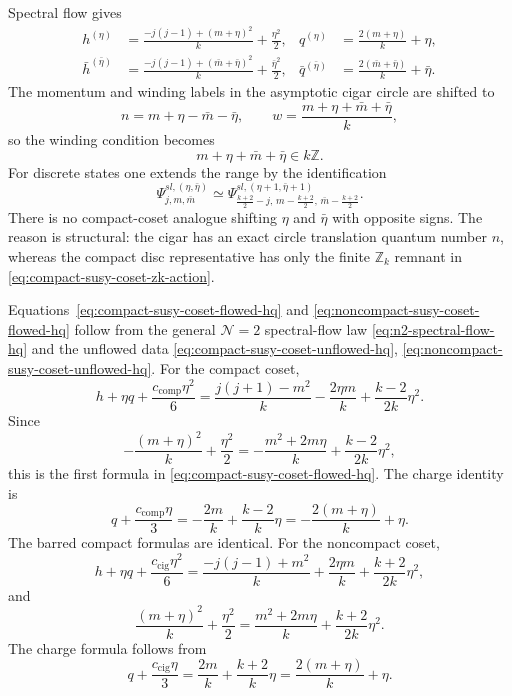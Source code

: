 Spectral flow gives
\begin{align}
  h^{(\eta)}
  &=
  \frac{-j(j-1)+(m+\eta)^2}{k}+\frac{\eta^2}{2},
  &
  q^{(\eta)}
  &=
  \frac{2(m+\eta)}{k}+\eta,
  \label{eq:noncompact-susy-coset-flowed-hq}\\
  \bar h^{(\bar\eta)}
  &=
  \frac{-j(j-1)+(\bar m+\bar\eta)^2}{k}
  +\frac{\bar\eta^2}{2},
  &
  \bar q^{(\bar\eta)}
  &=
  \frac{2(\bar m+\bar\eta)}{k}+\bar\eta .
  \nonumber
\end{align}
The momentum and winding labels in the asymptotic cigar circle are shifted
to
\begin{equation}
  n=m+\eta-\bar m-\bar\eta,
  \qquad
  w=\frac{m+\eta+\bar m+\bar\eta}{k},
  \label{eq:noncompact-susy-coset-momentum-winding}
\end{equation}
so the winding condition becomes
\begin{equation}
  m+\eta+\bar m+\bar\eta\in k\mathbb Z .
  \label{eq:noncompact-susy-coset-flowed-winding}
\end{equation}
For discrete states one extends the range by the identification
\begin{equation}
  \Psi^{sl,(\eta,\bar\eta)}_{j,m,\bar m}
  \simeq
  \Psi^{sl,(\eta+1,\bar\eta+1)}
       _{\frac{k+2}{2}-j,\,
         m-\frac{k+2}{2},\,\bar m-\frac{k+2}{2}} .
  \label{eq:noncompact-susy-coset-field-identification}
\end{equation}
There is no compact-coset analogue shifting \(\eta\) and \(\bar\eta\) with
opposite signs.  The reason is structural: the cigar has an exact circle
translation quantum number \(n\), whereas the compact disc representative has
only the finite \(\mathbb Z_k\) remnant in
\eqref{eq:compact-susy-coset-zk-action}.

\begin{remark}
\label{rem:supersymmetric-rank-one-spectral-flow-check}
Equations~\eqref{eq:compact-susy-coset-flowed-hq} and
\eqref{eq:noncompact-susy-coset-flowed-hq} follow from the general
\(\mathcal N=2\) spectral-flow law
\eqref{eq:n2-spectral-flow-hq} and the unflowed data
\eqref{eq:compact-susy-coset-unflowed-hq},
\eqref{eq:noncompact-susy-coset-unflowed-hq}.
For the compact coset,
\[
  h+\eta q+\frac{c_{\mathrm{comp}}\eta^2}{6}
  =
  \frac{j(j+1)-m^2}{k}
  -\frac{2\eta m}{k}
  +\frac{k-2}{2k}\eta^2 .
\]
Since
\[
  -\frac{(m+\eta)^2}{k}+\frac{\eta^2}{2}
  =
  -\frac{m^2+2m\eta}{k}
  +\frac{k-2}{2k}\eta^2,
\]
this is the first formula in
\eqref{eq:compact-susy-coset-flowed-hq}.  The charge identity is
\[
  q+\frac{c_{\mathrm{comp}}\eta}{3}
  =
  -\frac{2m}{k}+\frac{k-2}{k}\eta
  =
  -\frac{2(m+\eta)}{k}+\eta .
\]
The barred compact formulas are identical.  For the noncompact coset,
\[
  h+\eta q+\frac{c_{\mathrm{cig}}\eta^2}{6}
  =
  \frac{-j(j-1)+m^2}{k}
  +\frac{2\eta m}{k}
  +\frac{k+2}{2k}\eta^2 ,
\]
and
\[
  \frac{(m+\eta)^2}{k}+\frac{\eta^2}{2}
  =
  \frac{m^2+2m\eta}{k}
  +\frac{k+2}{2k}\eta^2.
\]
The charge formula follows from
\[
  q+\frac{c_{\mathrm{cig}}\eta}{3}
  =
  \frac{2m}{k}+\frac{k+2}{k}\eta
  =
  \frac{2(m+\eta)}{k}+\eta .
\]
\end{remark}

